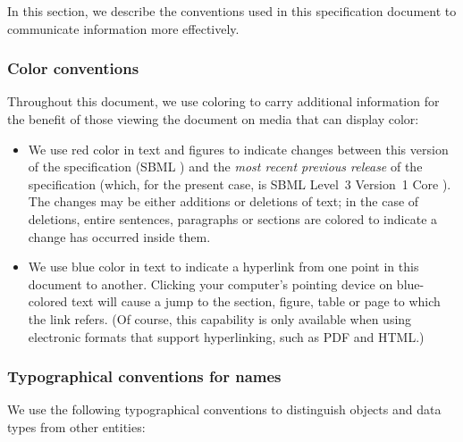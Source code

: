In this section, we describe the conventions used in this
specification document to communicate information more
effectively.

\subsubsection{Color conventions}
\label{sec:notation-color}

Throughout this document, we use coloring to carry additional
information for the benefit of those viewing the document on media
that can display color:

\begin{itemize}

\item We use red color in text and figures to indicate changes
  between this version of the specification (SBML \thisLVR) and
  the \emph{most recent previous release} of the specification
  (which, for the present case, is SBML Level~3 Version~1 Core
  \emph{}).  The changes may be either
  additions or deletions of text; in the case of deletions, entire
  sentences, paragraphs or sections are colored to indicate a
  change has occurred inside them.

\item We use blue color in text to indicate a hyperlink from one
  point in this document to another.  Clicking your computer's
  pointing device on blue-colored text will cause a jump to the
  section, figure, table or page to which the link refers.  (Of
  course, this capability is only available when using electronic
  formats that support hyperlinking, such as PDF and
  HTML.)

\end{itemize}


\subsubsection{Typographical conventions for names}
\label{sec:notation-typographical}

We use the following typographical conventions to distinguish
objects and data types from other entities:

